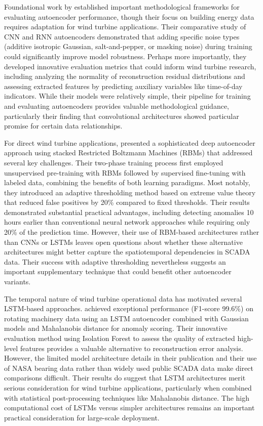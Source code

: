 \documentclass[a4paper,12pt]{article}
\begin{document}
Foundational work by \citeauthor{fan_analytical_2018} established important methodological frameworks for evaluating autoencoder performance, though their focus on building energy data requires adaptation for wind turbine applications. Their comparative study of CNN and RNN autoencoders demonstrated that adding specific noise types (additive isotropic Gaussian, salt-and-pepper, or masking noise) during training could significantly improve model robustness. Perhaps more importantly, they developed innovative evaluation metrics that could inform wind turbine research, including analyzing the normality of reconstruction residual distributions and assessing extracted features by predicting auxiliary variables like time-of-day indicators. While their models were relatively simple, their pipeline for training and evaluating autoencoders provides valuable methodological guidance, particularly their finding that convolutional architectures showed particular promise for certain data relationships.

For direct wind turbine applications, \citeauthor{zhao_anomaly_2018} presented a sophisticated deep autoencoder approach using stacked Restricted Boltzmann Machines (RBMs) that addressed several key challenges. Their two-phase training process first employed unsupervised pre-training with RBMs followed by supervised fine-tuning with labeled data, combining the benefits of both learning paradigms. Most notably, they introduced an adaptive thresholding method based on extreme value theory that reduced false positives by 20\% compared to fixed thresholds. Their results demonstrated substantial practical advantages, including detecting anomalies 10 hours earlier than conventional neural network approaches while requiring only 20\% of the prediction time. However, their use of RBM-based architectures rather than CNNs or LSTMs leaves open questions about whether these alternative architectures might better capture the spatiotemporal dependencies in SCADA data. Their success with adaptive thresholding nevertheless suggests an important supplementary technique that could benefit other autoencoder variants.

The temporal nature of wind turbine operational data has motivated several LSTM-based approaches. \citeauthor{ahmad_autoencoder-based_2020} achieved exceptional performance (F1-score 99.6\%) on rotating machinery data using an LSTM autoencoder combined with Gaussian models and Mahalanobis distance for anomaly scoring. Their innovative evaluation method using Isolation Forest to assess the quality of extracted high-level features provides a valuable alternative to reconstruction error analysis. However, the limited model architecture details in their publication and their use of NASA bearing data rather than widely used public SCADA data make direct comparisons difficult. Their results do suggest that LSTM architectures merit serious consideration for wind turbine applications, particularly when combined with statistical post-processing techniques like Mahalanobis distance. The high computational cost of LSTMs versus simpler architectures remains an important practical consideration for large-scale deployment.
\end{document}
